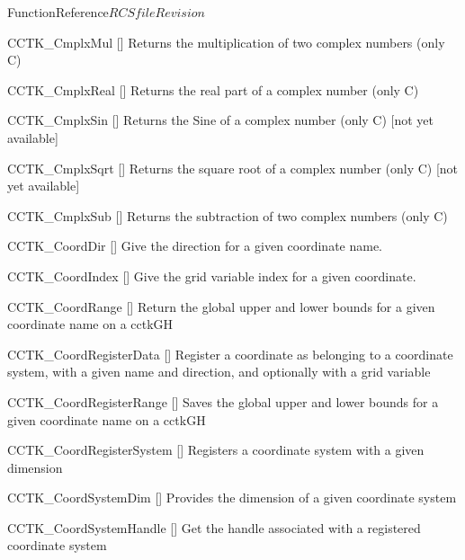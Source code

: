 \begin{cactuspart}{FunctionReference}{$RCSfile$}{$Revision$}
\begin{Lentry}
\item[CCTK\_CmplxMul]
  [\pageref{CCTK-CmplxMul}]
  Returns the multiplication of two complex numbers (only C)

\item[CCTK\_CmplxReal]
  [\pageref{CCTK-CmplxReal}]
  Returns the real part of a complex number (only C)

\item[CCTK\_CmplxSin]
  [\pageref{CCTK-CmplxSin}]
  Returns the Sine of a complex number (only C) [not yet available]

\item[CCTK\_CmplxSqrt]
  [\pageref{CCTK-CmplxSqrt}]
  Returns the square root of a complex number (only C) [not yet available]

\item[CCTK\_CmplxSub]
  [\pageref{CCTK-CmplxSub}]
  Returns the subtraction of two complex numbers (only C)

\item[CCTK\_CoordDir]
  [\pageref{CCTK-CoordDir}]
  Give the direction for a given coordinate name.

\item[CCTK\_CoordIndex]
  [\pageref{CCTK-CoordIndex}]
  Give the grid variable index for a given coordinate.

\item[CCTK\_CoordRange]
  [\pageref{CCTK-CoordRange}]
  Return the global upper and lower bounds for a given coordinate name on a cctkGH

\item[CCTK\_CoordRegisterData]
  [\pageref{CCTK-CoordRegisterData}]
  Register a coordinate as belonging to a coordinate system, with a given name and direction, and
  optionally with a grid variable

\item[CCTK\_CoordRegisterRange]
  [\pageref{CCTK-CoordRegisterRange}]
  Saves the global upper and lower bounds for a given coordinate name on a cctkGH

\item[CCTK\_CoordRegisterSystem]
  [\pageref{CCTK-CoordRegisterSystem}]
  Registers a coordinate system with a given dimension

\item[CCTK\_CoordSystemDim]
  [\pageref{CCTK-CoordDim}]
  Provides the dimension of a given coordinate system

\item[CCTK\_CoordSystemHandle]
  [\pageref{CCTK-CoordSystemHandle}]
  Get the handle associated with a registered coordinate system


\end{Lentry}
\end{cactuspart}
